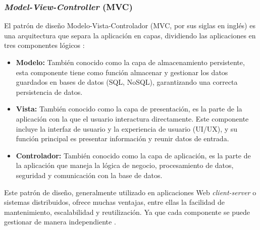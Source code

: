 \subsubsection{\textit{Model-View-Controller} (MVC)}
El patrón de diseño Modelo-Vista-Controlador (MVC, por sus siglas en inglés) es una arquitectura que separa la aplicación 
en capas, dividiendo las aplicaciones en tres componentes lógicos \cite{RANA2022271, yalupin2021programacionFrontEndBackEnd}:
\begin{itemize}
    \item \textbf{Modelo:} También conocido como la capa de almacenamiento persistente, esta componente tiene como función 
            almacenar y gestionar los datos guardados en bases de datos (SQL, NoSQL), garantizando una correcta persistencia
            de datos.
    \item \textbf{Vista:} También conocido como la capa de presentación, es la parte de la aplicación con la que el
            usuario interactura directamente. Este componente incluye la interfaz de usuario y la experiencia de usuario 
            (UI/UX), y su función principal es presentar información y reunir datos de entrada.
    \item \textbf{Controlador:} También conocido como la capa de aplicación, es la parte de la aplicación que maneja la 
            lógica de negocio, procesamiento de datos, seguridad y comunicación con la base de datos.
\end{itemize}
Este patrón de diseño, generalmente utilizado en aplicaciones Web \textit{client-server} o sistemas distribuidos, ofrece muchas
ventajas, entre ellas la facilidad de mantenimiento, escalabilidad y reutilización. Ya que cada componente se puede gestionar de
manera independiente \cite{RANA2022271}.

